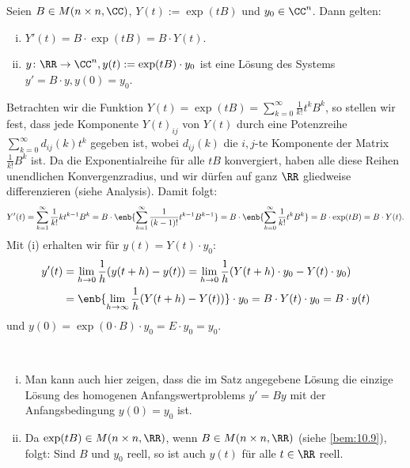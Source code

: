 \begin{satz}
	\label{satz:10.13}
	Seien $B \in M(n \times n,\CC)$, $Y(t) := \exp(tB)$ und $y_0 \in \CC^{n}$.
	Dann gelten:
	\begin{enumerate}[(i)]
		\item $Y'(t) = B \cdot \exp(tB) = B \cdot Y(t)$.
		\item $y\colon \RR \rightarrow \CC^{n}, y(t) := \exp(tB) \cdot y_0$ ist eine Lösung des Systems $y' = B \cdot y, y(0) = y_0$.
	\end{enumerate}
\end{satz}

\begin{beweis}
	Betrachten wir die Funktion $Y(t) = \exp(tB) = \sum_{k=0}^{\infty} \frac{1}{k!} t^{k} B^{k}$, so stellen wir fest, dass jede Komponente $Y(t)_{ij}$ von $Y(t)$ durch eine Potenzreihe $\sum_{k=0}^{\infty} d_{ij}(k)t^{k}$ gegeben ist, wobei $d_{ij}(k)$ die $i,j$-te Komponente der Matrix $\frac{1}{k!} B^{k}$ ist.
	Da die Exponentialreihe für alle $tB$ konvergiert, haben alle diese Reihen unendlichen Konvergenzradius, und wir dürfen auf ganz $\RR$ gliedweise differenzieren (siehe Analysis).
	Damit folgt:	
	\[
		Y'(t) = \sum_{k=1}^{\infty} \frac{1}{k!} kt^{k-1} B^{k} = B \cdot \enb{\sum_{k=1}^{\infty} \frac{1}{(k-1)!} t^{k-1} B^{k-1}} = B \cdot \enb{\sum_{k=0}^{\infty} \frac{1}{k!} t^{k} B^{k}} = B \cdot \exp(tB) = B \cdot Y(t).
	\]
	Mit (i) erhalten wir für $y(t) = Y(t) \cdot y_0$:
	\begin{align*}
		y'(t) &= \lim\limits_{h \rightarrow 0} \frac{1}{h} (y(t+h)-y(t)) = \lim\limits_{h \rightarrow 0} \frac{1}{h} (Y(t+h) \cdot y_0 - Y(t) \cdot y_0) \\
		&= \enb{\lim\limits_{h \rightarrow \infty} \frac{1}{h}(Y(t+h)-Y(t))} \cdot y_0 = B \cdot Y(t) \cdot y_0 = B \cdot y(t)
	\end{align*}
	und $y(0) = \exp(0\cdot B) \cdot y_0 = E \cdot y_0 = y_0$. 
\end{beweis}

\begin{bemerkung}
	\label{bem:10.14}
	\mbox{} \\[-1.4cm]
	\begin{enumerate}[(i)]
		\item Man kann auch hier zeigen, dass die im Satz angegebene Lösung die einzige Lösung des homogenen Anfangswertproblems $y' = By$ mit der Anfangsbedingung $y(0) = y_0$ ist.
		\item Da $\exp(tB) \in M(n \times n,\RR)$, wenn $B \in M(n \times n,\RR)$ (siehe \autoref{bem:10.9}), folgt:
		Sind $B$ und $y_0$ reell, so ist auch $y(t)$ für alle $t \in \RR$ reell.
	\end{enumerate}
\end{bemerkung}

